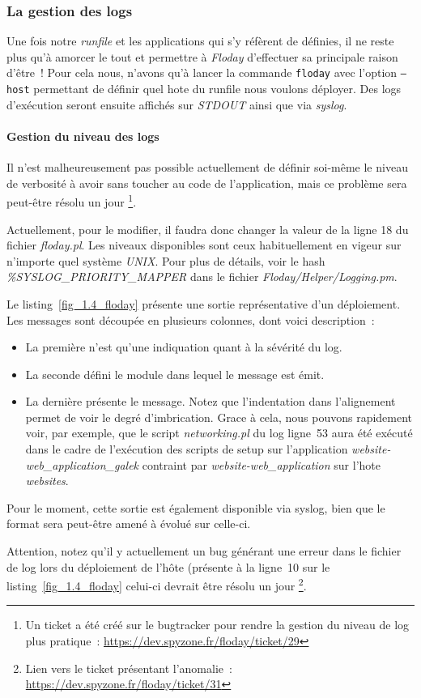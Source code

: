 \subsubsection{La gestion des logs}

Une fois notre \emph{runfile} et les applications qui s'y réfèrent de définies, il ne reste plus qu'à amorcer le tout et permettre à \emph{Floday} d'effectuer sa principale raison d'être~!
Pour cela nous, n'avons qu'à lancer la commande {\tt floday} avec l'option {\tt --host} permettant de définir quel \gls{hote} du runfile nous voulons déployer.
Des logs d'exécution seront ensuite affichés sur \emph{STDOUT} ainsi que via \emph{syslog}.

\paragraph{Gestion du niveau des logs}
Il n'est malheureusement pas possible actuellement de définir soi-même le niveau de verbosité à avoir sans toucher au code de l'application, mais ce problème sera peut-être résolu un jour%
\footnote{Un ticket a été créé sur le bugtracker pour rendre la gestion du niveau de log plus pratique~: \url{https://dev.spyzone.fr/floday/ticket/29}}.

Actuellement, pour le modifier, il faudra donc changer la valeur de la ligne 18 du fichier \emph{floday.pl}.
Les niveaux disponibles sont ceux habituellement en vigeur sur n'importe quel système \emph{UNIX}.
Pour plus de détails, voir le hash \emph{\%SYSLOG\_PRIORITY\_MAPPER} dans le fichier \emph{Floday/Helper/Logging.pm}.



Le listing~\ref{fig_1.4_floday} présente une sortie représentative d'un déploiement.
Les messages sont découpée en plusieurs colonnes, dont voici description~:
\begin{itemize}
	\item La première n'est qu'une indiquation quant à la sévérité du log.
	\item La seconde défini le module dans lequel le message est émit.
	\item La dernière présente le message. Notez que l'indentation dans l'alignement permet de voir le degré d'imbrication. Grace à cela, nous pouvons rapidement voir, par exemple, que le script \emph{networking.pl} du log ligne~53 aura été exécuté dans le cadre de l'exécution des scripts de setup sur l'\gls{application} \emph{website-web\_application\_galek} contraint par \emph{website-web\_application} sur l'\gls{hote} \emph{websites}.
\end{itemize}

Pour le moment, cette sortie est également disponible via syslog, bien que le format sera peut-être amené à évolué sur celle-ci.

Attention, notez qu'il y actuellement un bug générant une erreur dans le fichier de log lors du déploiement de l'hôte (présente à la ligne~10 sur le listing~\ref{fig_1.4_floday} celui-ci devrait être résolu un jour%
\footnote{Lien vers le ticket présentant l'anomalie~: \url{https://dev.spyzone.fr/floday/ticket/31}}.
